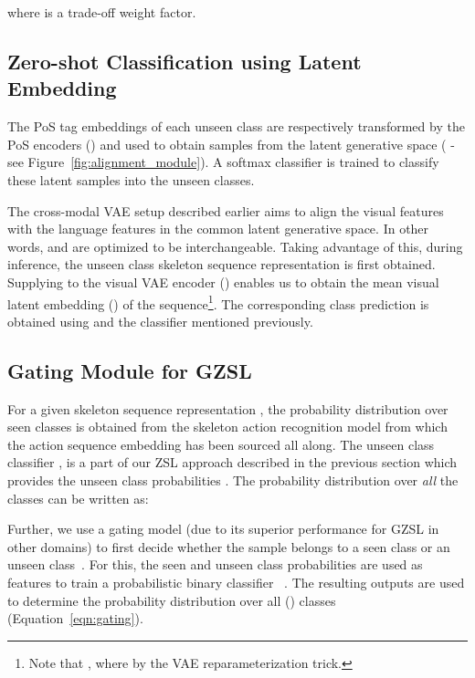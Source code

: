 \documentclass{article}
\begin{document}
where  is a trade-off weight factor.

\subsection {Zero-shot Classification using Latent Embedding} 
\label{sec:zslclassifier}

The PoS tag embeddings of each unseen class are respectively transformed by the PoS encoders () and used to obtain samples from the latent generative space ( - see Figure~\ref{fig:alignment_module}). A softmax classifier  is trained to classify these latent samples into the unseen classes.

The cross-modal VAE setup described earlier aims to align the visual features with the language features in the common latent generative space. In other words,  and  are optimized to be interchangeable. Taking advantage of this, during inference, the unseen class skeleton sequence representation  is first obtained. Supplying  to the visual VAE encoder () enables us to obtain the mean visual latent embedding () of the sequence\footnote{Note that , where  by the VAE reparameterization trick.}. The corresponding class prediction is obtained using  and the classifier  mentioned previously. 

\subsection{Gating Module for GZSL}
\label{sec:gating}

For a given skeleton sequence representation , the probability distribution  over seen classes is obtained from the skeleton action recognition model  from which the action sequence embedding has been sourced all along. The unseen class classifier , is a part of our ZSL approach described in the previous section which provides the unseen class probabilities . The probability distribution over \textit{all} the classes can be written as:



Further, we use a gating model (due to its superior performance for GZSL in other domains) to first decide whether the sample belongs to a seen class or an unseen class~\cite{atzmon2019adaptive}. For this, the seen and unseen class probabilities are used as features to train a probabilistic binary classifier ~\cite{atzmon2019adaptive}. The resulting outputs are used to determine the probability distribution over all () classes (Equation~\ref{eqn:gating}). 
\end{document}
